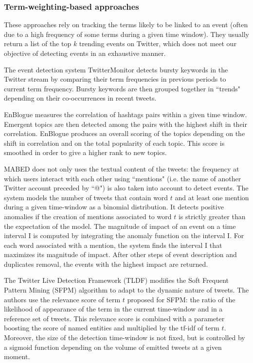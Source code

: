 		\subsubsection{Term-weighting-based approaches}
		These approaches rely on tracking the terms likely to be linked to an event (often due to a high frequency of some terms during a given time window). They usually return a list of the top $k$ trending events on Twitter, which does not meet our objective of detecting events in an exhaustive manner.
		
		The event detection system TwitterMonitor \citep{mathioudakis_twittermonitor:_2010} detects bursty keywords in the Twitter stream by comparing their term frequencies in previous periods to current term frequency. Bursty keywords are then grouped together in ``trends" depending on their co-occurrences in recent tweets. 
		
		EnBlogue \citep{alvanaki_see_2012} measures the correlation of hashtags pairs within a given time window. Emergent topics are then detected among the pairs with the highest shift in their correlation. EnBlogue produces an overall scoring of the topics depending on the shift in correlation and on the total popularity of each topic. This score is smoothed in order to give a higher rank to new topics. 
		
		MABED \citep{guille_event_2015} does not only uses the textual content of the tweets: the frequency at which users interact with each other using ``mentions" (i.e. the name of another Twitter account preceded by ``@") is also taken into account to detect events. The system models the number of tweets that contain word $t$ and at least one mention during a given time-window as a binomial distribution. It detects positive anomalies if the creation of mentions associated to word $t$ is strictly greater than the expectation of the model. The magnitude of impact of an event on a time interval I is computed by integrating the anomaly function on the interval I. For each word associated with a mention, the system finds the interval I that maximizes its magnitude of impact. After other steps of event description and duplicates removal, the events with the highest impact are returned.
		
		The Twitter Live Detection Framework (TLDF) \citep{gaglio_framework_2016} modifies the Soft Frequent Pattern Mining (SFPM) algorithm \citep{petkos_soft_2014} to adapt to the dynamic nature of tweets. The authors use the relevance score of term $t$ proposed for SFPM: the ratio of the likelihood of appearance of the term in the current time-window and in a reference set of tweets. This relevance score is combined with a parameter boosting the score of named entities and multiplied by the $\mbox{tf-idf}$ of term $t$. Moreover, the size of the detection time-window is not fixed, but is controlled by a sigmoid function depending on the volume of emitted tweets at a given moment.
				
